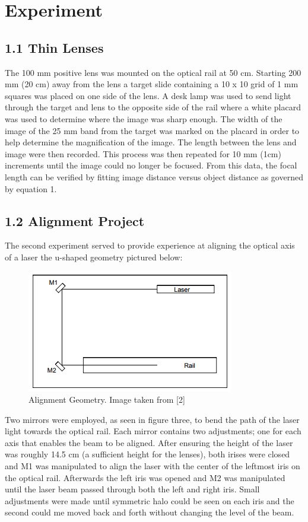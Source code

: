 \documentclass[letter, 11pt, onecolumn]{article}
\begin{document}
	\section*{Experiment} 
		\subsection*{1.1 Thin Lenses} 
		The 100 mm positive lens was mounted on the optical rail at 50 cm. Starting 200 mm (20 cm) away from the lens a target slide containing a 10 x 10 grid of 1 mm squares was placed on one side of the lens. A desk lamp was used to send light through the target and lens to the opposite side of the rail where a white placard was used to determine where the image was sharp enough. The width of the image of the 25 mm band from the target was marked on the placard in order to help determine the magnification of the image. The length between the lens and image were then recorded. This process was then repeated for 10 mm (1cm) increments until the image could no longer be focused. From this data, the focal length can be verified by fitting image distance versus object distance as governed by equation 1. 
		
		\subsection*{1.2 Alignment Project}
		The second experiment served to provide experience at aligning the optical axis of a laser the u-shaped geometry pictured below: \\
		
			\begin{figure}[h!]
				\centering
				\includegraphics[width=0.4\columnwidth]{u_geometry}
				\caption{Alignment Geometry. Image taken from [2]}
			\end{figure}
		\noindent Two mirrors were employed, as seen in figure three, to bend the path of the laser light towards the optical rail. Each mirror contains two adjustments; one for each axis that enables the beam to be aligned. After ensuring the height of the laser was roughly 14.5 cm (a sufficient height for the lenses), both irises were closed and M1 was manipulated to align the laser with the center of the leftmost iris on the optical rail. Afterwards the left iris was opened and M2 was manipulated until the laser beam passed through both the left and right iris. Small adjustments were made until symmetric halo could be seen on each iris and the second could me moved back and forth without changing the level of the beam. 
		
\end{document}
